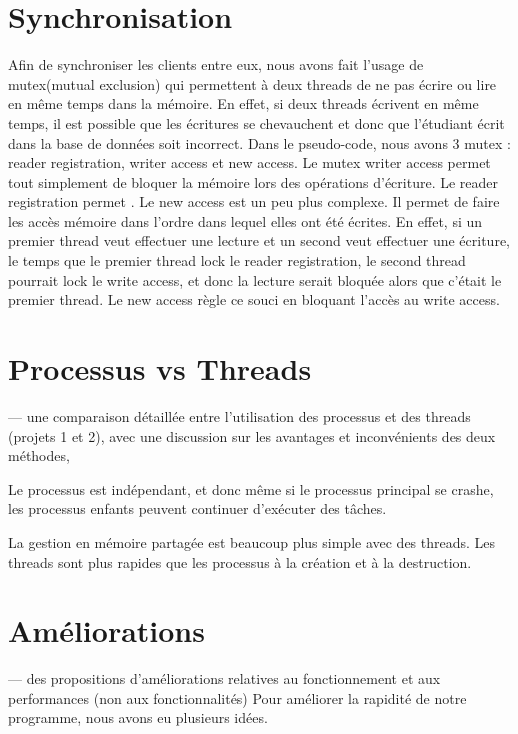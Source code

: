 \documentclass[utf8]{article}
\begin{document}
\section{Synchronisation}
\par
\indent
Afin de synchroniser les clients entre eux, nous avons fait l'usage de mutex(mutual exclusion) qui permettent 
à deux threads de ne pas écrire ou lire en même temps dans la mémoire.
En effet, si deux threads écrivent en même temps, il est possible que les écritures se chevauchent et donc que l'étudiant écrit dans la base de données soit incorrect.
Dans le pseudo-code, nous avons 3 mutex : reader registration, writer access et new access.
Le mutex writer access permet tout simplement de bloquer la mémoire lors des opérations d'écriture. Le reader registration permet .
Le new access est un peu plus complexe. Il permet de faire les accès mémoire dans l'ordre dans lequel elles ont été écrites.
En effet, si un premier thread veut effectuer une lecture et un second veut effectuer une écriture, le temps que le premier thread lock le reader registration, le second 
thread pourrait lock le write access, et donc la lecture serait bloquée alors que c'était le premier thread.
Le new access règle ce souci en bloquant l'accès au write access.
\par
\section{Processus vs Threads}
\par
\indent
— une comparaison détaillée entre l’utilisation des processus et des threads (projets 1 et 2),
avec une discussion sur les avantages et inconvénients des deux méthodes,

Le processus est indépendant, et donc même si le processus principal se crashe, les processus enfants peuvent continuer d'exécuter des tâches.

La gestion en mémoire partagée est beaucoup plus simple avec des threads.
Les threads sont plus rapides que les processus à la création et à la destruction.
\par
\section{Améliorations}
\par
\indent
— des propositions d’améliorations relatives au fonctionnement et aux performances (non
aux fonctionnalités)
Pour améliorer la rapidité de notre programme, nous avons eu plusieurs idées.
\end{document}
